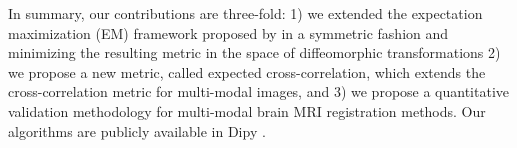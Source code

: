In summary, our contributions are three-fold: 1) we extended the expectation maximization (EM) framework proposed by \cite{Arce-santana2014} in a symmetric fashion and minimizing the resulting metric in the space of diffeomorphic transformations 2) we propose a new metric, called expected cross-correlation, which extends the cross-correlation metric for multi-modal images, and 3) we propose a quantitative validation methodology for multi-modal brain MRI registration methods. Our algorithms are publicly available in Dipy \citep{Garyfallidis2014}.\\
